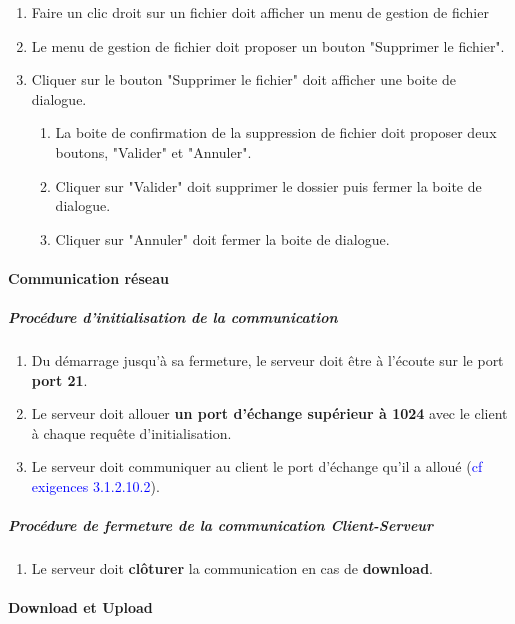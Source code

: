 \documentclass[10pt,a4paper]{report}
\begin{document}
\begin{enumerate}
		\item Faire un clic droit sur un fichier doit afficher un menu de gestion de fichier
		\item Le menu de gestion de fichier doit proposer un bouton "Supprimer le fichier".
		\item Cliquer sur le bouton "Supprimer le fichier" doit afficher une boite de dialogue.
		\begin{enumerate}[label=\arabic*.]
			\item La boite de confirmation de la suppression de fichier doit proposer deux boutons, "Valider" et "Annuler".
			\item Cliquer sur "Valider" doit supprimer le dossier puis fermer la boite de dialogue.
			\item Cliquer sur "Annuler" doit fermer la boite de dialogue.
		\end{enumerate}
	\end{enumerate}	
	
\paragraph{Communication réseau}

	\subparagraph{Procédure d'initialisation de la communication}

		\begin{enumerate}
			\item  Du démarrage jusqu'à sa fermeture, le serveur doit être à l'écoute sur le port \textbf{port 21}.

			\item Le serveur doit allouer \textbf{un port d'échange supérieur à 1024} avec le client à chaque requête d'initialisation.

			\item Le serveur doit communiquer au client le port d'échange qu'il a alloué (\textcolor{blue}{cf exigences 3.1.2.10.2}).

		\end{enumerate}
		
\subparagraph{Procédure de fermeture de la communication Client-Serveur}

	\begin{enumerate}
		\item Le serveur doit \textbf{clôturer} la communication en cas de \textbf{download}. 
	\end{enumerate}

\paragraph{Download et Upload}
	
\end{document}
